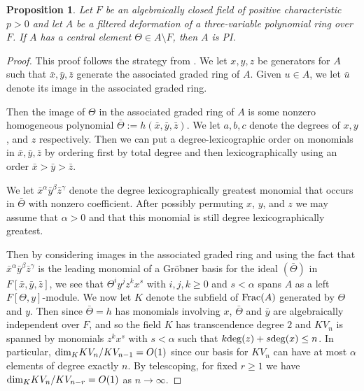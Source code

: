 \documentclass[a4paper,11pt,twoside,notitlepage,reqno]{amsart}
\theoremstyle{plain}
\numberwithin{thm}{section}
\newtheorem{prop}[thm]{Proposition}
\theoremstyle{definition}
\begin{document}
\begin{prop}
\label{prop:invoke}
Let $F$ be an algebraically closed field of positive characteristic $p>0$ and let $A$ be a filtered deformation of a three-variable polynomial ring over $F$.  If $A$ has a central element $\Theta \in A\setminus F$, then $A$ is PI.
\end{prop}
\begin{proof} This proof follows the strategy from \cite{Bell}.  We let $x,y,z$ be generators for $A$ such that $\bar{x},\bar{y},\bar{z}$ generate the associated graded ring of $A$.  Given $u\in A$, we let $\bar{u}$ denote its image in the associated graded ring. 

Then the image of $\Theta$ in the associated graded ring of $A$ is some nonzero homogeneous polynomial $\bar{\Theta}:=h(\bar{x},\bar{y},\bar{z})$.  
We let $a,b,c$ denote the degrees of $x,y$, and $z$ respectively.  Then we can put a degree-lexicographic order on monomials in $\bar{x},\bar{y},\bar{z}$ by ordering first by total degree and then lexicographically using an order $\bar{x}>\bar{y}>\bar{z}$. 

We let $\bar{x}^{\alpha} \bar{y}^{\beta} \bar{z}^{\gamma}$ denote the degree lexicographically greatest monomial that occurs in $\bar{\Theta}$ with nonzero coefficient. After possibly permuting $x$, $y$, and $z$ we may assume that $\alpha>0$ and that this monomial is still degree lexicographically greatest.  

Then by considering images in the associated graded ring and using the fact that $\bar{x}^{\alpha} \bar{y}^{\beta} \bar{z}^{\gamma}$ is the leading monomial of a Gr\"obner basis for the ideal $(\bar{\Theta})$ in $F[\bar{x},\bar{y},\bar{z}]$, we see that $\Theta^i y^j z^k x^s$ with $i,j,k\ge 0$ and $s<\alpha$ spans $A$ as a left $F[\Theta,y]$-module.  We now let $K$ denote the subfield of ${\rm Frac}(A)$ generated by $\Theta$ and $y$.  Then since $\bar{\Theta}=h$ has monomials involving $x$, $\bar{\Theta}$ and $\bar{y}$ are algebraically independent over $F$, and so the field $K$ has transcendence degree $2$ and $KV_n$ is spanned by monomials $z^k x^s$ with $s<\alpha$ such that $k{\rm deg}(z)+s {\rm deg}(x)\le n$.  In particular, 
${\rm dim}_K KV_n/KV_{n-1}=O(1)$ since our basis for $KV_n$ can have at most $\alpha$ elements of degree exactly $n$.  By telescoping, for fixed $r\ge 1$ we have
${\rm dim}_K KV_n/KV_{n-r}=O(1)$ as $n\to\infty$.  


\end{proof}
\end{document}
